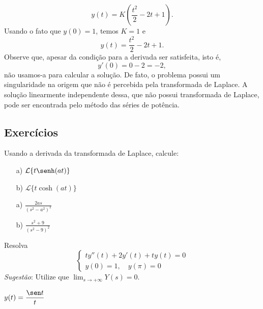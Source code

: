 \begin{ex}
\begin{equation}
y(t)=K\left(\frac{t^2}{2}-2t+1\right).
\end{equation}
Usando o fato que $y(0)=1$, temos $K=1$ e
\begin{equation}
y(t)=\frac{t^2}{2}-2t+1.
\end{equation}
Observe que, apesar da condição para a derivada ser satisfeita, isto é,
\begin{equation}
y'(0)=0-2=-2,
\end{equation}
não usamos-a para calcular a solução. De fato, o problema possui um singularidade na origem que não é percebida pela transformada de Laplace. A solução linearmente independente dessa, que não possui transformada de Laplace, pode ser encontrada pelo método das séries de potência.
\end{ex}

\subsection*{Exercícios}
\begin{exer}
Usando a derivada da transformada de Laplace, calcule:
\begin{itemize}
  \item[a)] $\displaystyle \mathcal{L} \{ t \senh (at) \}$
  \item[b)] $\displaystyle \mathcal{L} \{ t \cosh (at) \}$
\end{itemize}
\end{exer}
\begin{resp}
 \begin{itemize}
  \item[a)] $\displaystyle \frac{2as}{(s^2 - a^2)^2}$
  \item[b)] $\displaystyle \frac{s^2 + 9}{(s^2 - 9)^2}$
 \end{itemize}
\end{resp}
\begin{exer}
Resolva
\[
\left\{
  \begin{array}{ll}
    ty'' (t) + 2y'(t) +ty(t) = 0 \\
    y(0)=1, \quad y(\pi) = 0
  \end{array}
\right.
\] \emph{Sugestão}: Utilize que $\displaystyle \lim_{s\to + \infty} Y(s) = 0.$
\end{exer}
\begin{resp}
 $\displaystyle y(t) = \frac{\sen t}{t}$
\end{resp}


